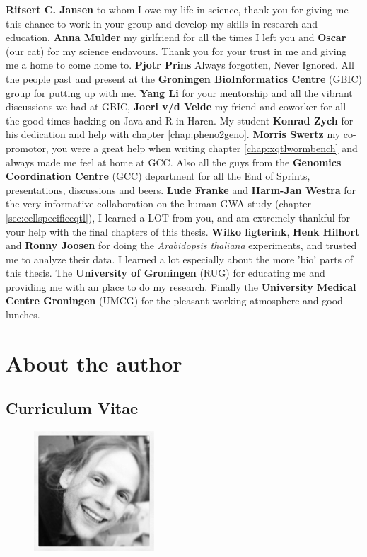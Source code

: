 {\bf Ritsert C. Jansen} to whom I owe my life in science, thank you for giving 
me this chance to work in your group and develop my skills in research and 
education. {\bf Anna Mulder} my girlfriend for all the times I left you and 
{\bf Oscar} (our cat) for my science endavours. Thank you for your trust in 
me and giving me a home to come home to. {\bf Pjotr Prins} Always forgotten, Never 
Ignored. All the people past and present at the {\bf Groningen BioInformatics Centre} 
(GBIC) group for putting up with me. {\bf Yang Li} for your mentorship and all 
the vibrant discussions we had at GBIC, {\bf Joeri v/d Velde} my friend and coworker 
for all the good times hacking on Java and R in Haren. My student {\bf Konrad Zych} 
for his dedication and help with chapter \ref{chap:pheno2geno}. {\bf Morris Swertz} 
my co-promotor, you were a great help when writing chapter \ref{chap:xqtlwormbench} 
and always made me feel at home at GCC. Also all the guys from the {\bf Genomics Coordination 
Centre} (GCC) department for all the End of Sprints, presentations, discussions and beers. 
{\bf Lude Franke} and {\bf Harm-Jan Westra} for the very informative collaboration on the 
human GWA study (chapter \ref{sec:cellspecificeqtl}), I learned a LOT from you, and am 
extremely thankful for your help with the final chapters of this thesis. {\bf Wilko ligterink}, 
{\bf Henk Hilhort} and {\bf Ronny Joosen} for doing the \emph{Arabidopsis thaliana} 
experiments, and trusted me to analyze their data. I learned a lot especially about 
the more 'bio' parts of this thesis. The {\bf University of Groningen} (RUG) for 
educating me and providing me with an place to do my research. Finally the {\bf 
University Medical Centre Groningen} (UMCG) for the pleasant working atmosphere 
and good lunches.

\newpage

\section*{About the author}
\subsection*{Curriculum Vitae}

\begin{figure}
  \centering
  \includegraphics[width=0.4\textwidth]{eps/image_6_1.eps}
\end{figure}

